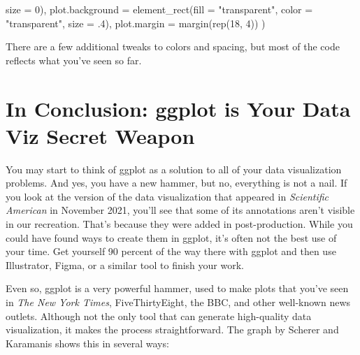 \documentclass[
]{book}
\newenvironment{Shaded}{\begin{snugshade}}{\end{snugshade}}
\newcommand{\AttributeTok}[1]{\textcolor[rgb]{0.77,0.63,0.00}{#1}}
\newcommand{\DecValTok}[1]{\textcolor[rgb]{0.00,0.00,0.81}{#1}}
\newcommand{\FunctionTok}[1]{\textcolor[rgb]{0.00,0.00,0.00}{#1}}
\newcommand{\NormalTok}[1]{#1}
\newcommand{\StringTok}[1]{\textcolor[rgb]{0.31,0.60,0.02}{#1}}
\begin{document}
\begin{Shaded}
\begin{Highlighting}[]
                                \AttributeTok{size =} \DecValTok{0}\NormalTok{),}
    \AttributeTok{plot.background =} \FunctionTok{element\_rect}\NormalTok{(}\AttributeTok{fill =} \StringTok{"transparent"}\NormalTok{, }
                                   \AttributeTok{color =} \StringTok{"transparent"}\NormalTok{, }
                                   \AttributeTok{size =}\NormalTok{ .}\DecValTok{4}\NormalTok{),}
    \AttributeTok{plot.margin =} \FunctionTok{margin}\NormalTok{(}\FunctionTok{rep}\NormalTok{(}\DecValTok{18}\NormalTok{, }\DecValTok{4}\NormalTok{))}
\NormalTok{  )}
\end{Highlighting}
\end{Shaded}

There are a few additional tweaks to colors and spacing, but most of the code reflects what you've seen so far.

\hypertarget{in-conclusion-ggplot-is-your-data-viz-secret-weapon}{%
\section*{In Conclusion: ggplot is Your Data Viz Secret Weapon}\label{in-conclusion-ggplot-is-your-data-viz-secret-weapon}}

You may start to think of ggplot as a solution to all of your data visualization problems. And yes, you have a new hammer, but no, everything is not a nail. If you look at the version of the data visualization that appeared in \emph{Scientific American} in November 2021, you'll see that some of its annotations aren't visible in our recreation. That's because they were added in post-production. While you could have found ways to create them in ggplot, it's often not the best use of your time. Get yourself 90 percent of the way there with ggplot and then use Illustrator, Figma, or a similar tool to finish your work.

Even so, ggplot is a very powerful hammer, used to make plots that you've seen in \emph{The New York Times}, FiveThirtyEight, the BBC, and other well-known news outlets. Although not the only tool that can generate high-quality data visualization, it makes the process straightforward. The graph by Scherer and Karamanis shows this in several ways:
\end{document}
